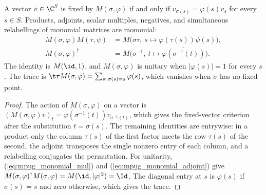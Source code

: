 \begin{lemma}
    \label{thm:mpug_monomial_matrix_laws}
    \leanok
    A vector $v\in\C^S$ is fixed by $M(\sigma,\varphi)$ if and only if
    $v_{\sigma(s)}=\varphi(s)v_s$ for every $s\in S$. Products, adjoints,
    scalar multiples, negatives, and simultaneous relabellings of monomial
    matrices are monomial:
    \begin{align}
        M(\sigma,\varphi)M(\tau,\psi)
         & =M\bigl(\sigma\tau,\ s\mapsto\varphi(\tau(s))\psi(s)\bigr),
        \label{eq:mpug_monomial_mul}                                               \\
        M(\sigma,\varphi)^\dagger
         & =M\bigl(\sigma^{-1},\ t\mapsto\overline{\varphi(\sigma^{-1}(t))}\bigr).
        \label{eq:mpug_monomial_adjoint}
    \end{align}
    The identity is $M(\id,1)$, and $M(\sigma,\varphi)$ is unitary when
    $|\varphi(s)|=1$ for every $s$. The trace is
    $\tr M(\sigma,\varphi)=\sum_{s:\,\sigma(s)=s}\varphi(s)$, which vanishes
    when $\sigma$ has no fixed point.
\end{lemma}

\begin{proof}\leanok
    The action of $M(\sigma,\varphi)$ on a vector is
    $(M(\sigma,\varphi)v)_t=\varphi(\sigma^{-1}(t))v_{\sigma^{-1}(t)}$, which
    gives the fixed-vector criterion after the substitution $t=\sigma(s)$.
    The remaining identities are entrywise: in a product only the column
    $\tau(s)$ of the first factor meets the row $\tau(s)$ of the second, the
    adjoint transposes the single nonzero entry of each column, and a
    relabelling conjugates the permutation. For unitarity,
    (\ref{eq:mpug_monomial_mul}) and (\ref{eq:mpug_monomial_adjoint}) give
    $M(\sigma,\varphi)^\dagger M(\sigma,\varphi)=M(\id,|\varphi|^2)=\Id$.
    The diagonal entry at $s$ is $\varphi(s)$ if $\sigma(s)=s$ and zero
    otherwise, which gives the trace.
\end{proof}

